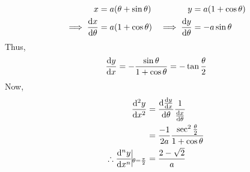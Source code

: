 \begin{anse}
	\[\begin{split}
		x&=a(\theta+\sin\theta)\\
		\implies \dv{x}{\theta}&=a(1+\cos\theta)
	\end{split}
	\quad
	\begin{split}
		y&=a(1+\cos\theta)\\
		\implies \dv{y}{\theta}&=-a\sin\theta
	\end{split}\]
	Thus,
	\[\dv{y}{x}=-\frac{\sin\theta}{1+\cos\theta}=-\tan\frac{\theta}{2}\]
	Now,
	\[\begin{split}
		\dv[2]{y}{x}&=\dv{\dv{y}{x}}{\theta}\frac{1}{\dv{x}{\theta}}\\
		&=\frac{-1}{2a}\frac{\sec^2\frac{\theta}{2}}{1+\cos\theta}\\
		\therefore \dv[n]{y}{x}\vline_{\theta=\frac{\pi}{2}}&=\frac{2-\sqrt{2}}{a}
	\end{split}\]
\end{anse}

